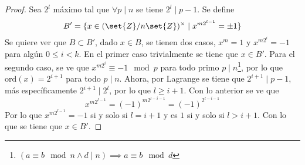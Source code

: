 \documentclass{ayudantia}
\begin{document}
\begin{proof}
    Sea \(2^l\) máximo tal que \(\forall p\mid n\) se tiene \(2^l\mid p-1\). Se define
    \begin{equation*}
        B'=\{x\in(\set{Z}/n\set{Z})^\times\mid x^{m2^{l-1}}=\pm1\}
    \end{equation*}
    Se quiere ver que \(B\subset B'\), dado \(x\in B\), se tienen dos casos, \(x^m=1\) y \(x^{m2^i}=-1\) para algún \(0\leq i<k\). En el primer caso trivialmente se tiene que \(x\in B'\). Para el segundo caso, se ve que \(x^{m2^i}\equiv-1\mod p\) para todo primo \(p\mid n\)\footnote{\((a\equiv b\mod n\wedge d\mid n)\implies a\equiv b\mod d\)}, por lo que \(\text{ord}(x)=2^{i+1}\) para todo \(p\mid n\). Ahora, por Lagrange se tiene que \(2^{i+1}\mid p-1\), más específicamente \(2^{i+1}\mid 2^l\), por lo que \(l\geq i+1\). Con lo anterior se ve que
    \begin{equation*}
        x^{m2^{l-1}}=(-1)^{m2^{l-i-1}}=(-1)^{2^{l-i-1}}
    \end{equation*}
    Por lo que \(x^{m2^{l-1}}=-1\) si y solo si \(l=i+1\) y es \(1\) si y solo si \(l>i+1\). Con lo que se tiene que \(x\in B'\).


\end{proof}
\end{document}
